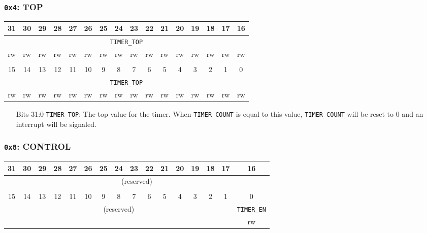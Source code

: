 \documentclass[11pt,openany]{report}
\begin{document}
\subsubsection{\texttt{0x4}: TOP}
\begin{center}
  \begin{tabular}{|c|c|c|c|c|c|c|c|c|c|c|c|c|c|c|c|}
    \hline
    31 & 30 & 29 & 28 & 27 & 26 & 25 & 24 & 23 & 22 & 21 & 20 & 19 & 18 & 17 & 16 \\
    \hline
    \multicolumn{16}{|c|}{\texttt{TIMER\_TOP}}\\
    \hline
    rw & rw & rw & rw & rw & rw & rw & rw & rw & rw & rw & rw & rw & rw & rw & rw\\
    \hline
    \multicolumn{16}{c}{}\\
    \hline
    15 & 14 & 13 & 12 & 11 & 10 & 9 & 8 & 7 & 6 & 5 & 4 & 3 & 2 & 1 & 0 \\
    \hline
    \multicolumn{16}{|c|}{\texttt{TIMER\_TOP}}\\
    \hline
    rw & rw & rw & rw & rw & rw & rw & rw & rw & rw & rw & rw & rw & rw & rw & rw\\
    \hline
  \end{tabular}
\end{center}

\begin{enumerate}
  \item[Bits 31:0] \verb|TIMER_TOP|: The top value for the timer. When \verb|TIMER_COUNT|
              is equal to this value, \verb|TIMER_COUNT| will be reset to 0 and
              an interrupt will be signaled.
\end{enumerate}

\subsubsection{\texttt{0x8}: CONTROL}
\begin{center}
  \begin{tabular}{|c|c|c|c|c|c|c|c|c|c|c|c|c|c|c|c|}
    \hline
    31 & 30 & 29 & 28 & 27 & 26 & 25 & 24 & 23 & 22 & 21 & 20 & 19 & 18 & 17 & 16 \\
    \hline
    \multicolumn{16}{|c|}{\multirow{2}{*}{(reserved)}}\\
    \multicolumn{16}{|c|}{}\\
    \hline
    \multicolumn{16}{c}{}\\
    \hline
    15 & 14 & 13 & 12 & 11 & 10 & 9 & 8 & 7 & 6 & 5 & 4 & 3 & 2 & 1 & 0 \\
    \hline
    \multicolumn{15}{|c|}{\multirow{2}{*}{(reserved)}} & \texttt{TIMER\_EN} \\
    \cline{16-16}
    \multicolumn{15}{|c|}{} & rw \\
    \hline
  \end{tabular}
\end{center}
\end{document}
